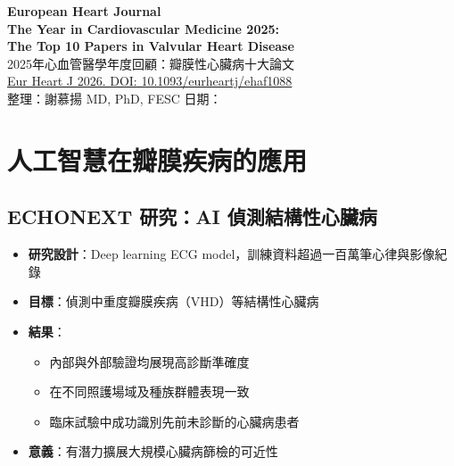 \documentclass[12pt,a4paper]{article}
\begin{document}
\begin{center}
{\LARGE\bfseries\textcolor{emergency_red}{European Heart Journal}}\\[0.5cm]
{\Large\textbf{The Year in Cardiovascular Medicine 2025:\\The Top 10 Papers in Valvular Heart Disease}}\\[0.3cm]
{\large 2025年心血管醫學年度回顧：瓣膜性心臟病十大論文}\\[0.5cm]
{\normalsize \href{https://doi.org/10.1093/eurheartj/ehaf1088}{Eur Heart J 2026. DOI: 10.1093/eurheartj/ehaf1088}}\\[0.3cm]
{\normalsize 整理：謝慕揚 MD, PhD, FESC \quad 日期：\mydate}
\end{center}

\vspace{0.5cm}


\section{人工智慧在瓣膜疾病的應用}

\subsection{ECHONEXT 研究：AI 偵測結構性心臟病}

\begin{itemize}
    \item \textbf{研究設計}：Deep learning ECG model，訓練資料超過一百萬筆心律與影像紀錄
    \item \textbf{目標}：偵測中重度瓣膜疾病（VHD）等結構性心臟病
    \item \textbf{結果}：
    \begin{itemize}
        \item 內部與外部驗證均展現高診斷準確度
        \item 在不同照護場域及種族群體表現一致
        \item 臨床試驗中成功識別先前未診斷的心臟病患者
    \end{itemize}
    \item \textbf{意義}：有潛力擴展大規模心臟病篩檢的可近性
\end{itemize}
\end{document}
